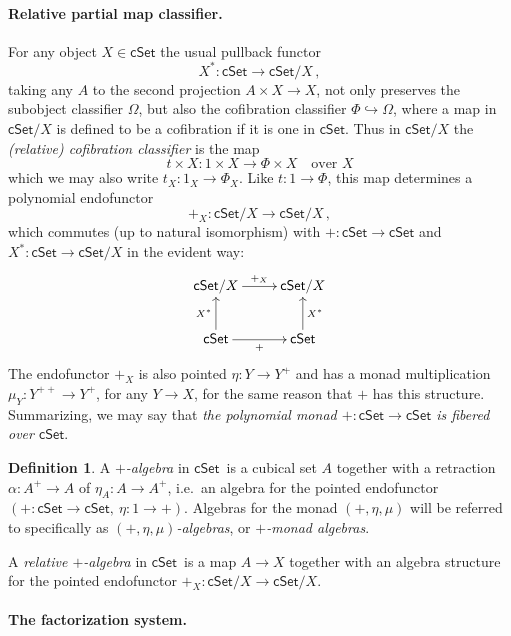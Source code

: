 \documentclass[11pt]{article}
\newcommand{\cSet}{\ensuremath{\mathsf{cSet}}}
\newcommand{\hook}{\ensuremath{\hookrightarrow}}
\theoremstyle{remark}
\theoremstyle{definition}
\newtheorem{definition}[theorem]{Definition}
\begin{document}
\paragraph{Relative partial map classifier.}

For any object $X\in\cSet$ the usual pullback functor $$X^* : \cSet \to \cSet/X\,,$$ taking any $A$ to the second projection $A\times X\to X$, not only preserves the subobject classifier $\Omega$, but also the cofibration classifier $\Phi \hook \Omega$, where a map in $\cSet/X$ is defined to be a cofibration if it is one in \cSet. Thus in $\cSet/X$ the \emph{(relative) cofibration classifier} is the map
\[
t \times X : 1\times X \to \Phi\times X	\quad\text{over $X$}
\]
which we may also write $t_X : 1_X \to \Phi_X$.  Like $t : 1\to \Phi$, this map determines a polynomial endofunctor  $$+_X : \cSet/X \to \cSet/X\,,$$ which commutes (up to natural isomorphism) with $+ : \cSet \to \cSet$ and $X^* : \cSet \to \cSet/X$ in the evident way:
\begin{equation}\label{diag:+fibered}
\xymatrix{
\cSet/X \ar[r]^{+_X}& \cSet/X \\
\cSet \ar[u]^{X^*} \ar[r]_+ & \ar[u]_{X^*}\cSet 
}
\end{equation}
The endofunctor $+_X$ is also pointed $\eta : Y \to Y^+$ and has a monad multiplication $\mu_Y : Y^{++} \to Y^+$, for any $Y\to X$, for the same reason that $+$ has this structure.  Summarizing, we may say that \emph{the polynomial monad $+ : \cSet \to \cSet$ is fibered over \cSet}.

\begin{definition}\label{def:+alg}
A \emph{$+$-algebra} in \cSet\ is a cubical set $A$ together with a retraction $\alpha : A^+\to A$ of $\eta_A : A \to A^+$, i.e.\ an algebra for the pointed endofunctor $(+ : \cSet\to \cSet,\ \eta : 1 \to +)$.  Algebras for the monad $(+, \eta, \mu)$ will be referred to specifically as \emph{$(+, \eta, \mu)$-algebras}, or \emph{$+$-monad algebras}. 

A \emph{relative $+$-algebra} in \cSet\ is a map $A \to X$ together with an algebra structure for the pointed endofunctor $+_X : \cSet/X \to \cSet/X$.
\end{definition}

\paragraph{The factorization system.}
\end{document}

